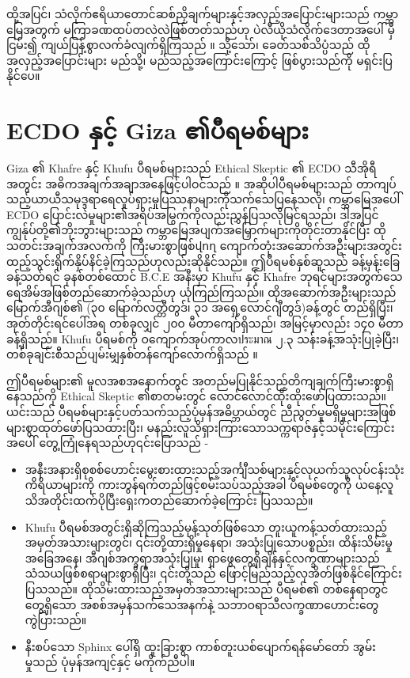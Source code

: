\documentclass[10pt,twocolumn,letterpaper]{article}
\begin{document}
ထို့အပြင်၊ သံလိုက်ဧရိယာတောင်ဆစ်ညှိချက်များနှင့်အလှည့်အပြောင်းများသည် ကမ္ဘာမြေအတွက် မကြာခဏထပ်တလဲလဲဖြစ်တတ်သည်ဟု ပဲလီယိုသံလိုက်ဒေတာအပေါ် မှီငြမ်း၍ ကျယ်ပြန့်စွာလက်ခံလျက်ရှိကြသည် \cite{35,40,41} ။ သို့သော်၊ ခေတ်သစ်သိပ္ပံသည် ထိုအလှည့်အပြောင်းများ မည်သို့၊ မည်သည့်အကြောင်းကြောင့် ဖြစ်ပွားသည်ကို မရှင်းပြနိုင်ပေ။

\section{ECDO နှင့် Giza ၏ပီရမစ်များ}

Giza ၏ Khafre နှင့် Khufu ပီရမစ်များသည် Ethical Skeptic ၏ ECDO သီအိုရီအတွင်း အဓိကအချက်အချာအနေဖြင့်ပါဝင်သည် \cite{27} ။ အဆိုပါပီရမစ်များသည် တာကျပ်သည့်ယာယီသမုဒ္ဒရာရေလှုပ်ရှားမှုပြဿနာများကိုသက်သေပြနေသလို၊ ကမ္ဘာမြေအပေါ် ECDO ပြောင်းလဲမှုများ၏အရိပ်အမြွက်ကိုလည်းညွှန်ပြသလိုမြင်ရသည်၊ ဒါ့အပြင် ကျွန်ုပ်တို့၏ဘိုးဘွားများသည် ကမ္ဘာမြေအပျက်အမြှောက်များကိုတိုင်းတာနိုင်ပြီး ထိုသတင်းအချက်အလက်ကို ကြီးမားစွာဖြစ်վող ကျောက်တုံးအဆောက်အဦးများအတွင်း ထည့်သွင်းရိုက်နှိပ်နိင်ခဲ့ကြသည်ဟုလည်းဆိုနိုင်သည်။ ဤပီရမစ်နှစ်ဆူသည် ခန့်မှန်းခြေ ခန့်သတ်ရင် ခုနစ်တစ်ထောင် B.C.E အနီးမှာ Khufu နှင့် Khafre ဘုရင်များအတွက်သေရေအိမ်အဖြစ်တည်ဆောက်ခဲ့သည်ဟု ယုံကြည်ကြသည်။ ထိုအဆောက်အဦးများသည် မြောက်အီဂျစ်၏ (၃၀ မြောက်လတ္တီတွဒ်၊ ၃၁ အရှေ့လောင်ဂျီတွဒ်)ခန့်တွင် တည်ရှိပြီး၊ အုတ်တိုင်းရင်ပေါ်အရ တစ်ခုလျှင် ၂၀၀ မီတာကျော်ရှိသည်၊ အမြင့်မှာလည်း ၁၄၀ မီတာခန့်ရှိသည်။ Khufu ပီရမစ်ကို ဝကျောက်အုပ်ကာလประมาณ ၂.၃ သန်းခန့်အသုံးပြုခဲ့ပြီး၊ တစ်ခုချင်းစီသည်ပျမ်းမျှနှစ်တန်ကျော်လောက်ရှိသည် \cite{24, 25}။

ဤပီရမစ်များ၏ မူလအစအနောက်တွင် အတည်မပြုနိုင်သည့်တိကျချက်ကြီးမားစွာရှိနေသည်ကို Ethical Skeptic ၏စာတမ်းတွင် လောင်လောင်ထိုးထိုးဖော်ပြထားသည်။ ယင်းသည် ပီရမစ်များနှင့်ပတ်သက်သည့်ပုံမှန်အဓိပ္ဘာယ်တွင် ညီညွတ်မှုမရှိမှုများအဖြစ် များစွာထုတ်ဖော်ပြသထားပြီး၊ မနည်းလူသိရှားကြားသောသက္ကရာဇ်နှင့်သမိုင်းကြောင်းအပေါ် တွေ့ကြုံနေရသည်ဟု၎င်းပြောသည် -

\begin{flushleft}
\begin{itemize}
    \item အနီးအနားရှိစုစစ်ဟောင်းမွေးစားထားသည့်အင်္ကျီသစ်များနှင့်လုယက်သူလုပ်ငန်းသုံးကိရိယာများကို ကားဘွန်ရက်တည်ဖြင့်စမ်းသပ်သည့်အခါ ပီရမစ်တွေကို ယနေ့လူသိအတိုင်းထက်ပိုပြီးရှေးကတည်ဆောက်ခဲ့ကြောင်း ပြသသည်။
    \item Khufu ပီရမစ်အတွင်းရှိဆိုကြသည့်မုန့်သုတ်ဖြစ်သော တူးယူကန့်သတ်ထားသည့် အမှတ်အသားများတွင်၊ ၎င်းတို့ထားရှိမှုနေရာ၊ အသုံးပြုသောပစ္စည်း၊ ထိန်းသိမ်းမှုအခြေအနေ၊ အီဂျစ်အက္ခရာအသုံးပြုမှု၊ ရှာဖွေတွေ့ရှိချိန်နှင့်လက္ခဏာများသည် သံသယဖြစ်စရာများစွာရှိပြီး၊ ၎င်းတို့သည် ဖြောင့်မြည်သည့်လုအိတ်ဖြစ်နိုင်ကြောင်းပြသသည်။ ထိုသိမ်းထားသည့်အမှတ်အသားများသည် ပီရမစ်၏ တစ်နေရာတွင်တွေ့ရှိသော အစစ်အမှန်သက်သေအနက်နဲ့ သဘာဝရာသီလက္ခဏာဟောင်းတွေကွဲပြားသည်။
    \item နီးစပ်သော Sphinx ပေါ်ရှိ ထူးခြားစွာ ကာစ်တူးယစ်ပျောက်ရန်မော်တော် အွမ်းမှုသည် ပုံမှန်အကျင့်နှင့် မကိုက်ညီပါ။
\end{itemize}

\end{flushleft}
\end{document}
